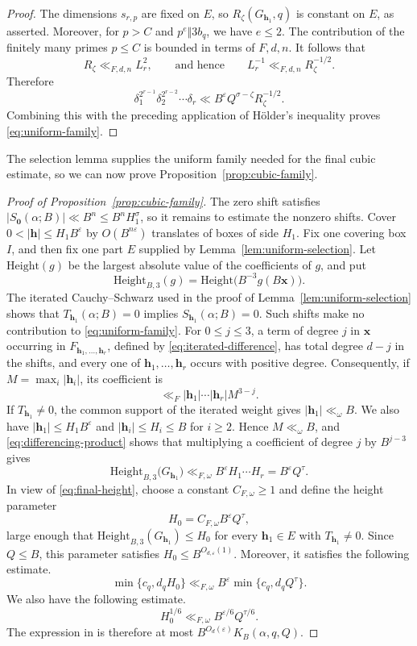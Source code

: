 \documentclass[reqno,a4paper,11pt]{amsart}
\numberwithin{equation}{section}
\newcommand{\x}{\mathbf{x}}
\newcommand{\h}{\mathbf h}
\newcommand{\eps}{\varepsilon}
\theoremstyle{plain}
\theoremstyle{definition}
\begin{document}
\begin{proof}
The dimensions \(s_{r,p}\) are fixed on \(E\), so \(R_\zeta(G_{\h_1},q)\) is constant on \(E\), as asserted.
Moreover, for \(p>C\) and \(p^e\Vert3b_q\), we have \(e\leq2\).
The contribution of the finitely many primes \(p\leq C\) is bounded in terms of \(F,d,n\).
It follows that
\[
 R_\zeta\ll_{F,d,n}L_r^2,
 \qquad\text{and hence}\qquad
 L_r^{-1}\ll_{F,d,n}R_\zeta^{-1/2}.
\]
Therefore
\[
 \delta_1^{2^{r-1}}\delta_2^{2^{r-2}}\cdots\delta_r
 \ll B^\eps Q^{\sigma-\zeta}R_\zeta^{-1/2}.
\]
Combining this with the preceding application of H\"older's inequality proves \eqref{eq:uniform-family}.
\end{proof}

The selection lemma supplies the uniform family needed for the final cubic estimate, so we can now prove Proposition~\ref{prop:cubic-family}.
\begin{proof}[Proof of Proposition~\ref{prop:cubic-family}]
The zero shift satisfies \(|S_{\boldsymbol 0}(\alpha;B)|\ll B^n\leq B^nH_1^\sigma\), so it remains to estimate the nonzero shifts.
Cover \(0<|\h|\leq H_1B^\eps\) by \(O(B^{n\eps})\) translates of boxes of side \(H_1\).
Fix one covering box \(I\), and then fix one part \(E\) supplied by Lemma~\ref{lem:uniform-selection}.
Let \(\mathrm{Height}(g)\) be the largest absolute value of the coefficients of \(g\), and put
\[
 \mathrm{Height}_{B,3}(g)
 =\mathrm{Height}\bigl(B^{-3}g(B\x)\bigr).
\]
The iterated Cauchy--Schwarz used in the proof of Lemma~\ref{lem:uniform-selection} shows that \(T_{\h_1}(\alpha;B)=0\) implies \(S_{\h_1}(\alpha;B)=0\).
Such shifts make no contribution to \eqref{eq:uniform-family}.
For \(0\leq j\leq3\), a term of degree \(j\) in \(\x\) occurring in \(F_{\h_1,\ldots,\h_r}\), defined by \eqref{eq:iterated-difference}, has total degree \(d-j\) in the shifts, and every one of \(\h_1,\ldots,\h_r\) occurs with positive degree.
Consequently, if \(M=\max_i|\h_i|\), its coefficient is
\[
 \ll_F |\h_1|\cdots|\h_r|M^{3-j}.
\]
If \(T_{\h_1}\neq0\), the common support of the iterated weight gives \(|\h_1|\ll_\omega B\).
We also have \(|\h_1|\leq H_1B^\eps\) and \(|\h_i|\leq H_i\leq B\) for \(i\geq2\).
Hence \(M\ll_\omega B\), and \eqref{eq:differencing-product} shows that multiplying a coefficient of degree \(j\) by \(B^{j-3}\) gives
\begin{equation}\label{eq:final-height}
 \mathrm{Height}_{B,3}
 \bigl(G_{\h_1}\bigr)
 \ll_{F,\omega} B^\eps H_1\cdots H_r
 =B^\eps Q^\tau.
\end{equation}
In view of \eqref{eq:final-height}, choose a constant \(C_{F,\omega}\geq1\) and define the height parameter
\[
 H_0=C_{F,\omega}B^\eps Q^\tau,
\]
large enough that \(\mathrm{Height}_{B,3}(G_{\h_1})\leq H_0\) for every \(\h_1\in E\) with \(T_{\h_1}\neq0\).
Since \(Q\leq B\), this parameter satisfies \(H_0\leq B^{O_{d,\eps}(1)}\).
Moreover, it satisfies the following estimate.
\[
 \min\{c_q,d_qH_0\}
 \ll_{F,\omega}
 B^\eps\min\{c_q,d_qQ^\tau\}.
\]
We also have the following estimate.
\[
 H_0^{1/6}
 \ll_{F,\omega}
 B^{\eps/6}Q^{\tau/6}.
\]
The expression in \cite[Lemma~3.4]{bp} is therefore at most \(B^{O_d(\eps)}K_B(\alpha,q,Q)\).


\end{proof}
\end{document}
